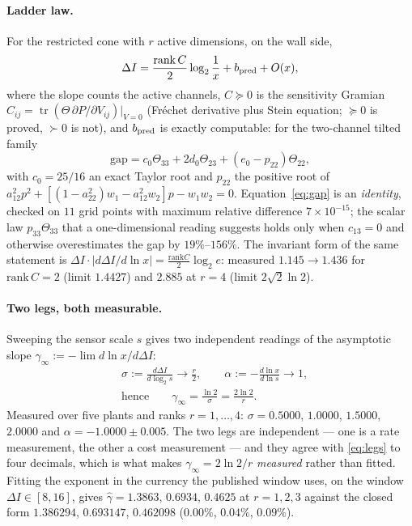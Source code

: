 \documentclass[journal]{IEEEtran}
\theoremstyle{remark}
\begin{document}
\paragraph{Ladder law.} For the restricted cone with $r$ active dimensions, on the
wall side,
\begin{equation}
  \Delta I=\frac{\mathrm{rank}\,C}{2}\log_2\frac1x+b_{\rm pred}+O(x),
  \label{eq:ladder}
\end{equation}
where the slope counts the active channels, $C\succeq0$ is the sensitivity Gramian
$C_{ij}=\operatorname{tr}(\Theta\,\partial P/\partial V_{ij})|_{V=0}$ (Fréchet
derivative plus Stein equation; $\succeq0$ is proved, $\succ0$ is not), and
$b_{\rm pred}$ is exactly computable: for the two-channel tilted family
\begin{equation}
  \mathrm{gap}=c_0\Theta_{33}+2d_0\Theta_{23}+(e_0-p_{22})\Theta_{22},
  \label{eq:gap}
\end{equation}
with $c_0=25/16$ an exact Taylor root and $p_{22}$ the positive root of
$a_{12}^2p^2+[(1-a_{22}^2)w_1-a_{12}^2w_2]p-w_1w_2=0$. Equation~\eqref{eq:gap} is an
\emph{identity}, checked on $11$ grid points with maximum relative difference
$7\times10^{-15}$; the scalar law $p_{33}\Theta_{33}$ that a one-dimensional
reading suggests holds only when $c_{13}=0$ and otherwise overestimates the gap by
$19\%$--$156\%$. The invariant form of the same statement is
$\Delta I\cdot|d\Delta I/d\ln x|=\frac{\mathrm{rank}C}{2}\log_2e$: measured
$1.145\to1.436$ for $\mathrm{rank}\,C=2$ (limit $1.4427$) and $2.885$ at $r=4$
(limit $2\sqrt{2}\ln2$).

\paragraph{Two legs, both measurable.} Sweeping the sensor scale $s$ gives two
independent readings of the asymptotic slope
$\gamma_\infty:=-\lim d\ln x/d\Delta I$:
\begin{equation}
  \begin{aligned}
  &\sigma:=\frac{d\Delta I}{d\log_2s}\longrightarrow\frac r2,
   \qquad
   \alpha:=-\frac{d\ln x}{d\ln s}\longrightarrow1,\\
  &\text{hence}\qquad \gamma_\infty=\frac{\ln2}{\sigma}=\frac{2\ln2}{r}.
  \end{aligned}
  \label{eq:legs}
\end{equation}
Measured over five plants and ranks $r=1,\dots,4$: $\sigma=0.5000$, $1.0000$,
$1.5000$, $2.0000$ and $\alpha=-1.0000\pm0.005$. The two legs are independent ---
one is a rate measurement, the other a cost measurement --- and they agree with
\eqref{eq:legs} to four decimals, which is what makes $\gamma_\infty=2\ln2/r$
\emph{measured} rather than fitted. Fitting the exponent in the currency the
published window uses, on the window $\Delta I\in[8,16]$, gives
$\hat\gamma=1.3863$, $0.6934$, $0.4625$ at $r=1,2,3$ against the closed form
$1.386294$, $0.693147$, $0.462098$ ($0.00\%$, $0.04\%$, $0.09\%$).
\end{document}
